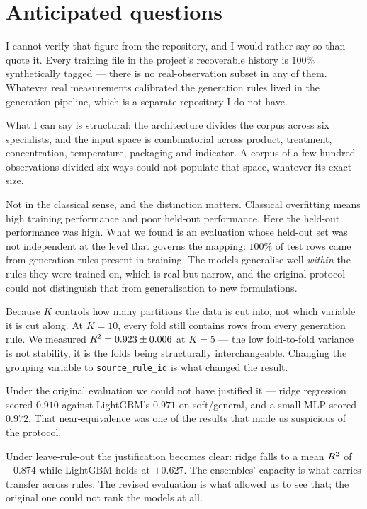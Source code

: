 \section{Anticipated questions}

\begin{questionbox}[title=``Were the original 400 observations enough to train on?'']
I cannot verify that figure from the repository, and I would rather say so
than quote it. Every training file in the project's recoverable history is
$100\%$ synthetically tagged --- there is no real-observation subset in any
of them. Whatever real measurements calibrated the generation rules lived
in the generation pipeline, which is a separate repository I do not have.

What I can say is structural: the architecture divides the corpus across
six specialists, and the input space is combinatorial across product,
treatment, concentration, temperature, packaging and indicator. A corpus of
a few hundred observations divided six ways could not populate that space,
whatever its exact size.
\end{questionbox}

\begin{questionbox}[title=``Was the original $\rsq$ overfitting?'']
Not in the classical sense, and the distinction matters. Classical
overfitting means high training performance and poor held-out performance.
Here the held-out performance was high. What we found is an evaluation
whose held-out set was not independent at the level that governs the
mapping: $100\%$ of test rows came from generation rules present in
training. The models generalise well \emph{within} the rules they were
trained on, which is real but narrow, and the original protocol could not
distinguish that from generalisation to new formulations.
\end{questionbox}

\begin{questionbox}[title=``Why didn't changing $K$ solve it?'']
Because $K$ controls how many partitions the data is cut into, not which
variable it is cut along. At $K=10$, every fold still contains rows from
every generation rule. We measured $R^2 = 0.923 \pm 0.006$ at $K=5$ --- the
low fold-to-fold variance is not stability, it is the folds being
structurally interchangeable. Changing the grouping variable to
\texttt{source\_rule\_id} is what changed the result.
\end{questionbox}

\begin{questionbox}[title=``Why did you use tree ensembles rather than something simpler?'']
Under the original evaluation we could not have justified it --- ridge
regression scored $0.910$ against LightGBM's $0.971$ on soft/general, and a
small MLP scored $0.972$. That near-equivalence was one of the results that
made us suspicious of the protocol.

Under leave-rule-out the justification becomes clear: ridge falls to a mean
$\rsq$ of $-0.874$ while LightGBM holds at $+0.627$. The ensembles' capacity
is what carries transfer across rules. The revised evaluation is what
allowed us to see that; the original one could not rank the models at all.
\end{questionbox}

